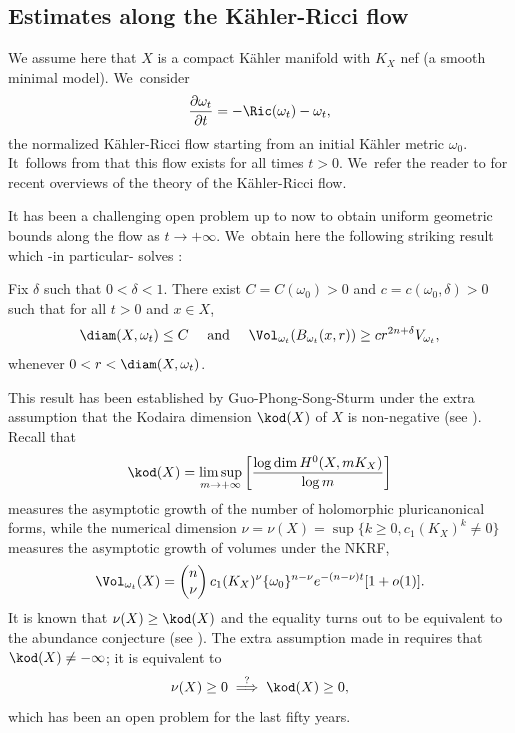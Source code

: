 \subsection{Estimates along the Kähler-Ricci flow} \label{sec:krf}

We assume here that $X$ is a compact Kähler manifold with $K_X$ nef (a smooth minimal model). We~consider
\[
\frac{\partial \omega_t}{\partial t}=-\Ric(\omega_t)-\omega_t,
\]
the normalized Kähler-Ricci flow starting from an initial Kähler metric $\omega_0$. It~follows from \cite{TZ06} that this flow exists for all times $t>0$. We~refer the reader to \cite{Tos18,Tos24} for recent overviews of the theory of the Kähler-Ricci flow.

It has been
a challenging open problem up to now to obtain uniform geometric bounds along the flow as $t \rightarrow +\infty$. We~obtain here the following striking result which -in particular- solves \cite[Conj.\,6.2]{Tos18}:

\begin{theorem} \label{thm:fkr}
Fix $\delta$ such that $0<\delta<1$.
There exist $C=C(\omega_0)>0$ and $c=c(\omega_0,\delta)>0$ such that for all $t>0$ and $x \in X$,
\[
\diam(X,\omega_t) \leq C
\quad \text{ and } \quad
\Vol_{\omega_t}(B_{\omega_t}(x,r)) \geq c r^{2n+\delta} V_{\omega_t},
\]
whenever $0<r<\diam(X,\omega_t)$.
\end{theorem}

This result has been established by Guo-Phong-Song-Sturm under the extra assumption that
the Kodaira dimension $\kod(X)$ of $X$ is non-negative (see \cite[Th.\,2.3]{GPSS22}).
Recall that
\[
\kod(X)=\limsup_{m \rightarrow+\infty} \left[ \frac{\log \dim H^0(X,mK_X)}{\log m} \right]
\]
measures the asymptotic growth of the number of holomorphic pluricanonical forms,
while the numerical dimension
$\nu=\nu(X)=\sup \{ k \geq 0, c_1(K_X)^k \neq 0 \}$
measures the asymptotic growth of volumes under the NKRF,
\begin{equation} \label{eq:volfkrn}
\Vol_{\omega_t}(X)=
\begin{pmatrix} n \\ \nu \end{pmatrix}
c_1(K_X)^{\nu} \{\omega_0\}^{n-\nu} e^{-(n-\nu)t} [1+o(1)].
\end{equation}
It is known that $\nu(X) \geq \kod(X)$ and the equality turns out to be equivalent to the abundance conjecture
(see \cite[Conj.\,6.3]{Tos18}).
The extra assumption made in \cite[Th.\,2.3]{GPSS22} requires that $\kod(X) \neq -\infty$;
it is equivalent to
\[
\nu(X) \geq 0 \stackrel{?}{\implies} \kod(X) \geq 0,
\]
which has been an open problem for the last fifty years.


